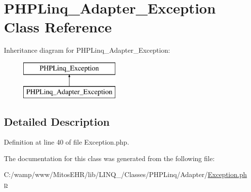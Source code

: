 \hypertarget{class_p_h_p_linq___adapter___exception}{\section{\-P\-H\-P\-Linq\-\_\-\-Adapter\-\_\-\-Exception \-Class \-Reference}
\label{class_p_h_p_linq___adapter___exception}
}
\-Inheritance diagram for \-P\-H\-P\-Linq\-\_\-\-Adapter\-\_\-\-Exception\-:\begin{figure}[H]
\begin{center}
\leavevmode
\includegraphics[height=2.000000cm]{class_p_h_p_linq___adapter___exception}
\end{center}
\end{figure}


\subsection{\-Detailed \-Description}


\-Definition at line 40 of file \-Exception.\-php.



\-The documentation for this class was generated from the following file\-:\begin{DoxyCompactItemize}
\item 
\-C\-:/wamp/www/\-Mitos\-E\-H\-R/lib/\-L\-I\-N\-Q\-\_/\-Classes/\-P\-H\-P\-Linq/\-Adapter/\hyperlink{_adapter_2_exception_8php}{\-Exception.\-php}\end{DoxyCompactItemize}
